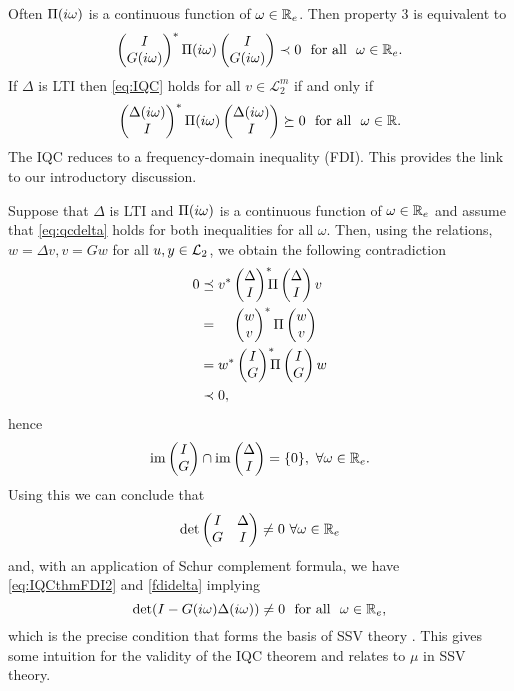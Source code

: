 \begin{rem}\label{remiqc2}
Often $\Pi(i\omega)$ is a continuous function of $\omega\in\mathbb{R}_e$. Then property 3 is equivalent to
\begin{equation}
\begin{pmatrix}I\\G(i\omega)\end{pmatrix}^*\Pi(i\omega)\begin{pmatrix}I\\G(i\omega)\end{pmatrix} \prec 0
\text{\ \ for all\ \ }\omega\in\mathbb{R}_e.
\label{eq:IQCthmFDI2}
\end{equation}
If $\Delta$ is LTI then \eqref{eq:IQC} holds for all $v\in\mathcal{L}^m_2$ if and only if
\begin{equation}
\begin{pmatrix}\Delta(i\omega)\\I\end{pmatrix}^*\Pi(i\omega)\begin{pmatrix}\Delta(i\omega)\\I\end{pmatrix} \succeq 0
\text{\ \ for all\ \ }\omega\in\mathbb{R}.
\label{fdidelta}
\end{equation}
The IQC reduces to a frequency-domain inequality (FDI). This provides the link to our introductory discussion.

Suppose that $\Delta$ is LTI and $\Pi(i\omega)$ is a continuous function of $\omega\in\mathbb{R}_e$ and assume that 
\eqref{eq:qcdelta} holds for both inequalities for all $\omega$. Then, using the relations, $w=\Delta v,v=G 
w$ for all $u,y\in\mathcal{L}_2$, we obtain the following contradiction
\begin{align}
0 &\preceq v^*\begin{pmatrix}\Delta\\I\end{pmatrix}^*\!\!\!\Pi\begin{pmatrix}\Delta\\I\end{pmatrix}v\\ &=\phantom{v^*}\begin{pmatrix}w\\v\end{pmatrix}^*\Pi\begin{pmatrix}w\\v\end{pmatrix}\\
&=w^*\begin{pmatrix}I\\G\end{pmatrix}^*\!\!\!\Pi\begin{pmatrix}I\\G\end{pmatrix}w \\&\prec 0, 
\end{align}
hence
\[
\operatorname{im}\begin{pmatrix}I\\G\end{pmatrix} \cap \operatorname{im}\begin{pmatrix}\Delta \\ I\end{pmatrix} =\{ 0 \} ,\ \forall \omega\in\mathbb{R}_e.
\]
Using this we can conclude that 
\[
\det\pmatr{I &\Delta\\G &I}\neq 0\ \forall \omega\in\Realext
\] 
and, with an application of Schur complement formula, we have \eqref{eq:IQCthmFDI2} and \eqref{fdidelta} implying
\begin{equation}
\det(I-G(\iw)\Delta(\iw))\neq 0\text{\ \ for all\ \ }\omega\in\Realext,
\end{equation}
which is the precise condition that forms the basis of SSV theory \cite{packdoyle}. This gives some 
intuition for the validity of the IQC theorem and relates to $\mu$ in SSV theory. 
\end{rem}

